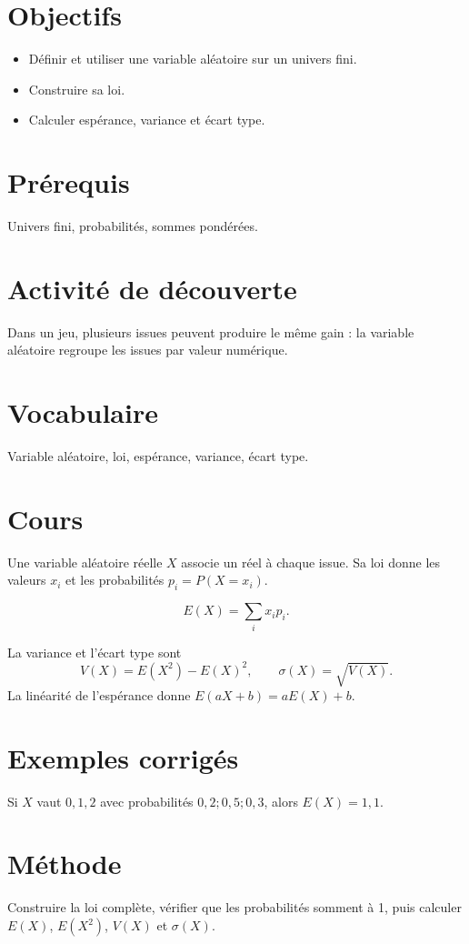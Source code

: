 \section{Objectifs}
\begin{itemize}
\item Définir et utiliser une variable aléatoire sur un univers fini.
\item Construire sa loi.
\item Calculer espérance, variance et écart type.
\end{itemize}

\section{Prérequis}
Univers fini, probabilités, sommes pondérées.

\section{Activité de découverte}
Dans un jeu, plusieurs issues peuvent produire le même gain : la variable aléatoire regroupe les issues par valeur numérique.

\section{Vocabulaire}
Variable aléatoire, loi, espérance, variance, écart type.

\section{Cours}
Une variable aléatoire réelle $X$ associe un réel à chaque issue. Sa loi donne les valeurs $x_i$ et les probabilités $p_i=P(X=x_i)$.

\[
E(X)=\sum_i x_ip_i.
\]

La variance et l’écart type sont
\[
V(X)=E(X^2)-E(X)^2,\qquad \sigma(X)=\sqrt{V(X)}.
\]
La linéarité de l’espérance donne $E(aX+b)=aE(X)+b$.

\section{Exemples corrigés}
Si $X$ vaut $0,1,2$ avec probabilités $0,2;0,5;0,3$, alors $E(X)=1,1$.

\section{Méthode}
Construire la loi complète, vérifier que les probabilités somment à 1, puis calculer $E(X)$, $E(X^2)$, $V(X)$ et $\sigma(X)$.

